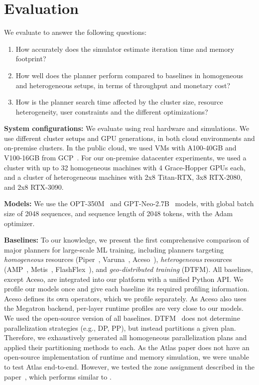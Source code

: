 \section{Evaluation}\label{sec:eval}

We evaluate \sailor to answer the following questions:

\begin{enumerate}
    \item How accurately does the \sailor simulator estimate iteration time and memory footprint?
    \item How well does the \sailor planner perform compared to baselines in homogeneous and heterogeneous setups, in terms of throughput and monetary cost?
     \item How is the \sailor planner search time affected by the cluster size, resource heterogeneity, user constraints and the different optimizations?

\end{enumerate}

\textbf{System configurations: } We evaluate \sailor using real hardware and simulations. We use different cluster setups and GPU generations, in both cloud environments and on-premise clusters. In the public cloud, we used VMs with A100-40GB and V100-16GB  from GCP~\cite{gcpgpus}. For our on-premise datacenter experiments, we used a cluster with up to 32 homogeneous machines with 4 Grace-Hopper GPUs each, and a cluster of heterogeneous machines with 2x8 Titan-RTX, 3x8 RTX-2080, and 2x8 RTX-3090. 

\textbf{Models:} We use the OPT-350M~\cite{hfopt} and GPT-Neo-2.7B~\cite{hfgptneo} models, with global batch size of 2048 sequences, and sequence length of 2048 tokens, with the Adam optimizer.

\textbf{Baselines: } To our knowledge, we present the first comprehensive comparison of major planners for large-scale ML training, including planners targeting \textit{homogeneous} resources (Piper~\cite{Tarnawski21Piper}, Varuna~\cite{Athlur22Varuna}, Aceso~\cite{Liu24Aceso}), \textit{heterogeneous} resources (AMP~\cite{li2022amp}, Metis~\cite{Um24Metis}, FlashFlex~\cite{yan2024flashflex}), and \textit{geo-distributed training} (DTFM\cite{yuan2023decentralized}). All baselines, except Aceso, are integrated into our platform with a unified Python API. We profile our models once and give each baseline its required profiling information.  Aceso defines its own operators, which we profile separately. As Aceso also uses the Megatron backend, per-layer runtime profiles are very close to our models. 
We used the open-source version of all baselines. DTFM~\cite{yuan2023decentralized} does not determine parallelization strategies (e.g., DP, PP), but instead partitions a given plan. Therefore, we exhaustively generated all homogeneous parallelization plans and applied their partitioning methods to each. As the Atlas paper does not have an open-source implementation of runtime and memory simulation, we were unable to test Atlas end-to-end. However, we tested the zone assignment described in the paper~\cite{palak2024atlas}, which performs similar to \sailor.

